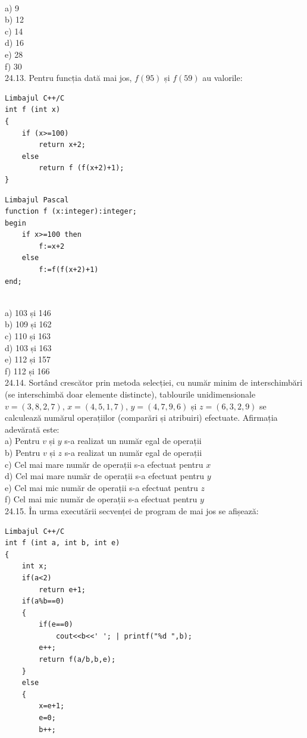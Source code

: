 {{\\
a) 9
\\
b) 12
\\
c) 14
\\
d) 16
\\
e) 28
\\
f) 30
\\
24.13. Pentru funcția dată mai jos, $f(95)$ și $f(59)$ au valorile:
\begin{verbatim}
Limbajul C++/C
int f (int x)
{
    if (x>=100)
        return x+2;
    else
        return f (f(x+2)+1);
}
\end{verbatim}
\begin{verbatim}
Limbajul Pascal
function f (x:integer):integer;
begin
    if x>=100 then
        f:=x+2
    else
        f:=f(f(x+2)+1)
end;
\end{verbatim}
\\
a) 103 și 146
\\
b) 109 și 162
\\
c) 110 și 163
\\
d) 103 și 163
\\
e) 112 și 157
\\
f) 112 și 166
\\
24.14. Sortând crescător prin metoda selecției, cu număr minim de interschimbări (se interschimbă doar elemente distincte), tablourile unidimensionale $v=(3,8,2,7)$, $x=(4,5,1,7)$, $y=(4,7,9,6)$ și $z=(6,3,2,9)$ se calculează numărul operațiilor (comparări și atribuiri) efectuate. Afirmația adevărată este:
\\
a) Pentru $v$ și $y$ s-a realizat un număr egal de operații
\\
b) Pentru $v$ și $z$ s-a realizat un număr egal de operații
\\
c) Cel mai mare număr de operații s-a efectuat pentru $x$
\\
d) Cel mai mare număr de operații s-a efectuat pentru $y$
\\
e) Cel mai mic număr de operații s-a efectuat pentru $z$
\\
f) Cel mai mic număr de operații s-a efectuat pentru $y$
\\
24.15. În urma executării secvenței de program de mai jos se afișează:
\begin{verbatim}
Limbajul C++/C
int f (int a, int b, int e)
{
    int x;
    if(a<2)
        return e+1;
    if(a%b==0)
    {
        if(e==0)
            cout<<b<<' '; | printf("%d ",b);
        e++;
        return f(a/b,b,e);
    }
    else
    {
        x=e+1;
        e=0;
        b++;

\end{verbatim}}}
